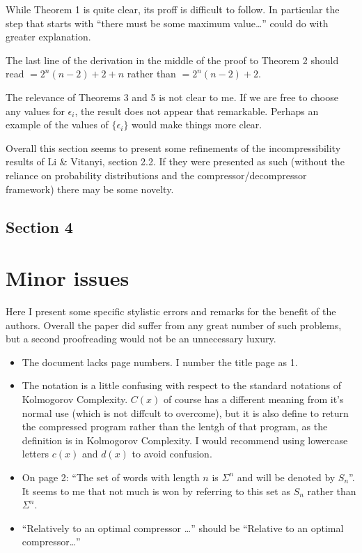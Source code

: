 \documentclass{article}
\theoremstyle{definition}
\begin{document}
While Theorem 1 is quite clear, its proff is difficult to follow. In particular the step that starts with ``there must be some maximum value\ldots'' could do with greater explanation.

The last line of the derivation in the middle of the proof to Theorem 2 should read $= 2^n(n-2) + 2 + n$ rather than $= 2^n(n-2) + 2$.

The relevance of Theorems 3 and 5 is not clear to me. If we are free to choose any values for $\epsilon_i$, the result does not appear that remarkable. Perhaps an example of the values of $\{\epsilon_i\}$ would make things more clear.

Overall this section seems to present some refinements of the incompressibility results of Li \& Vitanyi, section 2.2. If they were presented as such (without the reliance on probability distributions and the compressor/decompressor framework) there may be some novelty. 


\subsection*{Section 4}




\section{Minor issues}

Here I present some specific stylistic errors and remarks for the benefit of the authors. Overall the paper did suffer from any great number of such problems, but a second proofreading would not be an unnecessary luxury.

\begin{itemize}
  \item The document lacks page numbers. I number the title page as 1.
  \item The notation is a little confusing with respect to the standard notations of Kolmogorov Complexity. $C(x)$ of course has a different meaning from it's normal use (which is not diffcult to overcome), but it is also define to return the compressed program rather than the lentgh of that program, as the definition is in Kolmogorov Complexity. I would recommend using lowercase letters $c(x)$ and $d(x)$ to avoid confusion.
  \item On page 2: ``The set of words with length $n$ is $\Sigma^n$ and will be denoted by $S_n$''. It seems to me that not much is won by referring to this set as $S_n$ rather than $\Sigma^n$.
  \item ``Relatively to an optimal compressor \ldots'' should be ``Relative to an optimal compressor\ldots''
\end{itemize}
\end{document}
